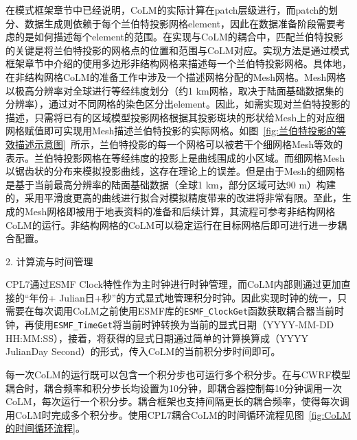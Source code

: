 在模式框架章节中已经说明，CoLM的实际计算在patch层级进行，而patch的划分、数据生成则依赖于每个兰伯特投影网格element，因此在数据准备阶段需要考虑的是如何描述每个element的范围。在实现与CoLM的耦合中，匹配兰伯特投影的关键是将兰伯特投影的网格点的位置和范围与CoLM对应。实现方法是通过模式框架章节中介绍的使用多边形非结构网格来描述每一个兰伯特投影网格。具体地，在非结构网格CoLM的准备工作中涉及一个描述网格分配的Mesh网格。Mesh网格以极高分辨率对全球进行等经纬度划分（约1 km网格，取决于陆面基础数据集的分辨率），通过对不同网格的染色区分出element。因此，如需实现对兰伯特投影的描述，只需将已有的区域模型投影网格根据其投影斑块的形状给Mesh上的对应细网格赋值即可实现用Mesh描述兰伯特投影的实际网格。如图~\ref{fig:兰伯特投影的等效描述示意图}~所示，兰伯特投影的每一个网格可以被若干个细网格Mesh等效的表示。兰伯特投影网格在等经纬度的投影上是曲线围成的小区域。而细网格Mesh以锯齿状的分布来模拟投影曲线，这存在理论上的误差。但是由于Mesh的细网格是基于当前最高分辨率的陆面基础数据（全球1 km，部分区域可达90 m）构建的，采用平滑度更高的曲线进行拟合对模拟精度带来的改进将非常有限。至此，生成的Mesh网格即被用于地表资料的准备和后续计算，其流程可参考非结构网格CoLM的运行。非结构网格的CoLM可以稳定运行在目标网格后即可进行进一步耦合配置。

2. 计算流与时间管理

CPL7通过ESMF Clock特性作为主时钟进行时钟管理，而CoLM内部则通过更加直接的“年份+ Julian日+秒”的方式显式地管理积分时钟。因此实现时钟的统一，只需要在每次调用CoLM之前使用ESMF库的\texttt{ESMF\_ClockGet}函数获取耦合器当前时钟，再使用\texttt{ESMF\_TimeGet}将当前时钟转换为当前的显式日期（YYYY-MM-DD HH:MM:SS），接着，将获得的显式日期通过简单的计算换算成（YYYY JulianDay Second）的形式，传入CoLM的当前积分步时间即可。

每一次CoLM的运行既可以包含一个积分步也可运行多个积分步。在与CWRF模型耦合时，耦合频率和积分步长均设置为10分钟，即耦合器控制每10分钟调用一次CoLM，每次运行一个积分步。耦合框架也支持间隔更长的耦合频率，使得每次调用CoLM时完成多个积分步。使用CPL7耦合CoLM的时间循环流程见图~\ref{fig:CoLM的时间循环流程}。


